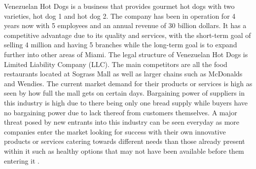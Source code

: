  Venezuelan Hot Dogs is a business that provides gourmet hot dogs with two varieties, hot dog 1 and hot dog 2. The company has been in operation for 4 years now with 5 employees and an annual revenue of 30 billion dollars. It has a competitive advantage due to its quality and services, with the short-term goal of selling 4 million and having 5 branches while the long-term goal is to expand further into other areas of Miami. The legal structure of Venezuelan Hot Dogs is Limited Liability Company (LLC). The main competitors are all the food restaurants located at Sograss Mall as well as larger chains such as McDonalds and Wendies. The current market demand for their products or services is high as seen by how full the mall gets on certain days. Bargaining power of suppliers in this industry is high due to there being only one bread supply while buyers have no bargaining power due to lack thereof from customers themselves. A major threat posed by new entrants into this industry can be seen everyday as more companies enter the market looking for success with their own innovative products or services catering towards different needs than those already present within it such as healthy options that may not have been available before them entering it . 

